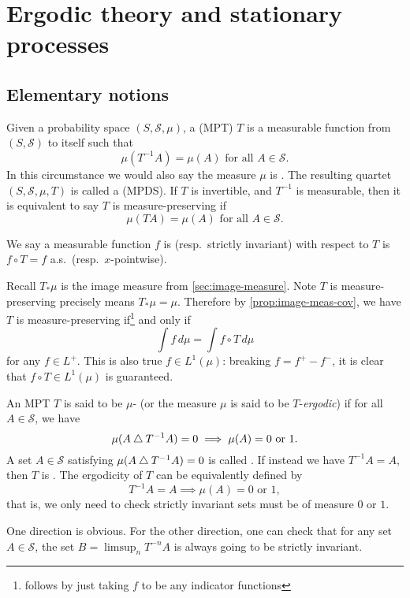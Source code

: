 \chapter{Ergodic theory and stationary processes}
\section{Elementary notions}
Given a probability space $(S,\mathcal S,\mu)$, a  (MPT) $T$ is a measurable function from $(S,\mathcal S)$ to itself such that \[
    \mu(T^{-1}A) = \mu(A)\text{ for all }A\in \mathcal S.
\] In this circumstance we would also say the measure $\mu$ is . The resulting quartet $(S,\mathcal S,\mu,T)$ is called a  (MPDS). If $T$ is invertible, and $T^{-1}$ is measurable, then it is equivalent to say $T$ is measure-preserving if \[
    \mu(TA) = \mu(A) \text{ for all }A\in \mathcal S.
\]

We say a measurable function $f$ is  (resp.\ strictly invariant) with respect to $T$ is $f \circ T = f$ a.s.\ (resp.\ $x$-pointwise).

Recall $T_*\mu$ is the image measure from \cref{sec:image-measure}. Note $T$ is measure-preserving  precisely means $T_*\mu = \mu$. Therefore by \cref{prop:image-meas-cov}, we have $T$ is measure-preserving if\footnote{follows by just taking $f$ to be any indicator functions} and only if \[
     \int f \,d\mu = \int f\circ T\,d\mu
\] for any $f \in L^+$. This is also true $f \in L^1(\mu)$: breaking $f = f^+ - f^-$, it is clear that $f \circ T \in L^1(\mu)$ is guaranteed. 

An MPT $T$ is said to be $\mu$- (or the measure $\mu$ is said to be $T$-\emph{ergodic}) if for all $A\in \mathcal S$, we have \[
    \mu(A \mathbin{\triangle} T^{-1} A) = 0 \implies \mu(A) = 0 \text{ or } 1.
\] A set $A\in \mathcal S$ satisfying $\mu(A \mathbin{\triangle} T^{-1} A) = 0$ is called . If instead we have $T^{-1}A = A$, then $T$ is . The ergodicity of $T$ can be equivalently defined by \[
    T^{-1} A = A \implies \mu(A) = 0 \text{ or } 1,
\] that is, we only need to check strictly invariant sets must be of measure $0$ or $1$.

One direction is obvious. For the other direction, one can check that for any set $A\in \mathcal S$, the set $B = \limsup_n T^{-n} A$ is always going to be strictly invariant.

